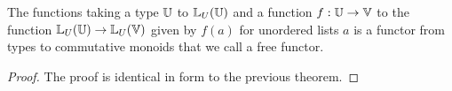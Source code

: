\documentclass[../math.tex]{subfiles}
\begin{document}
\begin{theorem}
    The functions taking a type $\mathbb{U}$ to $\mathbb{L}_U(\mathbb{U})$ and a function $f : \mathbb{U} \to
    \mathbb{V}$ to the function $\mathbb{L}_U(\mathbb{U}) \to \mathbb{L}_U(\mathbb{V})$ given by $f(a)$ for unordered
    lists $a$ is a functor from types to commutative monoids that we call a free
    functor.
\end{theorem}
\begin{proof}
    The proof is identical in form to the previous theorem.
\end{proof}
\end{document}
